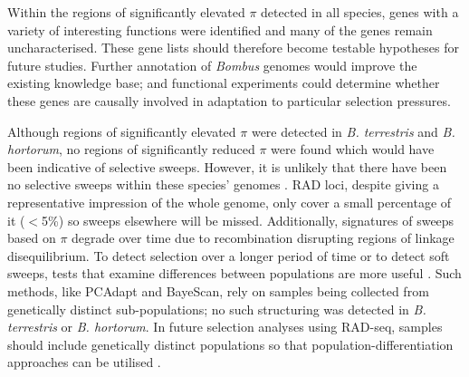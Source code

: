 \documentclass[12pt]{article}
\begin{document}
\begin{linenumbers}

		Within the regions of significantly elevated $\pi$ detected in all species, genes with a variety of interesting functions were identified and many of the genes remain uncharacterised. These gene lists should therefore become testable hypotheses for future studies.
		Further annotation of \emph{Bombus} genomes would improve the existing knowledge base; and functional experiments could determine whether these genes are causally involved in adaptation to particular selection pressures. 
		

		Although regions of significantly elevated $\pi$ were detected in \emph{B. terrestris} and \emph{B. hortorum}, 
		no regions of significantly reduced $\pi$ were found which would have been indicative of selective sweeps. However, it is unlikely that there have been no selective sweeps within these species' genomes \citep{colgan_genomic_2022}. RAD loci, despite giving a representative impression of the whole genome, only cover a small percentage of it ($<$5\%) so sweeps elsewhere will be missed. Additionally, signatures of sweeps based on $\pi$ degrade over time due to recombination disrupting regions of linkage disequilibrium. To detect selection over a longer period of time or to detect soft sweeps, tests that examine differences between populations are more useful \citep{hohenlohe_using_2010}. Such methods, like PCAdapt and BayeScan, rely on samples being collected from genetically distinct sub-populations; no such structuring was detected in \emph{B. terrestris} or \emph{B. hortorum}. 
		In future selection analyses using RAD-seq, samples should include genetically distinct populations so that population-differentiation approaches can be utilised \citep{davey_radseq_2010, hohenlohe_population_2012}.

    	

\end{linenumbers}
\end{document}

